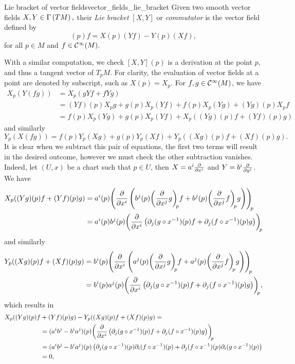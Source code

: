 \begin{definition}{Lie bracket of vector fields}{vector_fields_lie_bracket}
    Given two smooth vector fields \(X, Y \in \Gamma\left(TM\right),\) their \emph{Lie bracket} \([X,Y]\) or \emph{commutator} is the vector field defined by
    \begin{equation*}
        [X,Y](p)f = X(p)(Yf) - Y(p)(Xf),
    \end{equation*}
    for all \(p \in M\) and \(f \in \mathcal{C}^\infty(M).\)
\end{definition}

With a similar computation, we check \([X,Y](p)\) is a derivation at the point \(p,\) and thus a tangent vector of \(T_pM\). For clarity, the evaluation of vector fields at a point are denoted by subscript, such as \(X(p) = X_p\). For \(f, g \in \mathcal{C}^\infty(M)\), we have
\begin{align*}
    X_p(Y(fg)) &= X_p(gYf + fYg)\\
               &= (Yf)(p)X_pg + g(p) X_p(Yf) + f(p) X_p(Yg) + (Yg)(p) X_pf\\
               &= f(p) X_p(Yg) + g(p) X_p(Yf) + X_p((Yg)(p) f + (Yf)(p) g)
\end{align*}
and similarly
\begin{equation*}
    Y_p(X(fg)) = f(p) Y_p(Xg) + g(p) Y_p(Xf) + Y_p((Xg)(p) f + (Xf)(p) g).
\end{equation*}
It is clear when we subtract this pair of equations, the first two terms will result in the desired outcome, however we must check the other subtraction vanishes. Indeed, let \((U, x)\) be a chart such that \(p \in U\), then \(X = a^i \bfield{x^i}\) and \(Y = b^i \bfield{y^i}\). We have
\begin{align*}
    X_p((Yg)(p) f + (Yf)(p) g) &= a^i(p) \bvec[{\left(b^j(p) \bvec[g]{x^j}{p} f + b^j(p)\bvec[f]{x^j}{p}g \right)}]{x^i}{p}\\
                               &= a^i(p)b^j(p)\bvec[{\left(\partial_j(g\circ x^{-1})(p) f + \partial_j(f \circ x^{-1})(p) g\right)}]{x^i}{p}
\end{align*}
and similarly
\begin{align*}
    Y_p((Xg)(p) f + (Xf)(p) g) &= b^i(p) \bvec[{\left(a^j(p) \bvec[g]{x^j}{p} f + a^j(p)\bvec[f]{x^j}{p}g \right)}]{x^i}{p}\\
                               &= b^i(p)a^j(p)\bvec[{\left(\partial_j(g\circ x^{-1})(p) f + \partial_j(f \circ x^{-1})(p) g\right)}]{x^i}{p},
\end{align*}
which results in
\begin{align*}
    X_p((Yg)(p) f &+ (Yf)(p) g) - Y_p((Xg)(p) f + (Xf)(p) g) =\\
     &=(a^ib^j - b^ia^j)(p)\bvec[{\left(\partial_j(g\circ x^{-1})(p) f + \partial_j(f \circ x^{-1})(p) g\right)}]{x^i}{p}\\
     &=(a^ib^j - b^ia^j)(p)\left(\partial_j(g\circ x^{-1})(p) \partial_i(f\circ x^{-1})(p)+ \partial_j(f \circ x^{-1})(p) \partial_i(g\circ x^{-1})(p)\right)\\
     &=0,
\end{align*}
